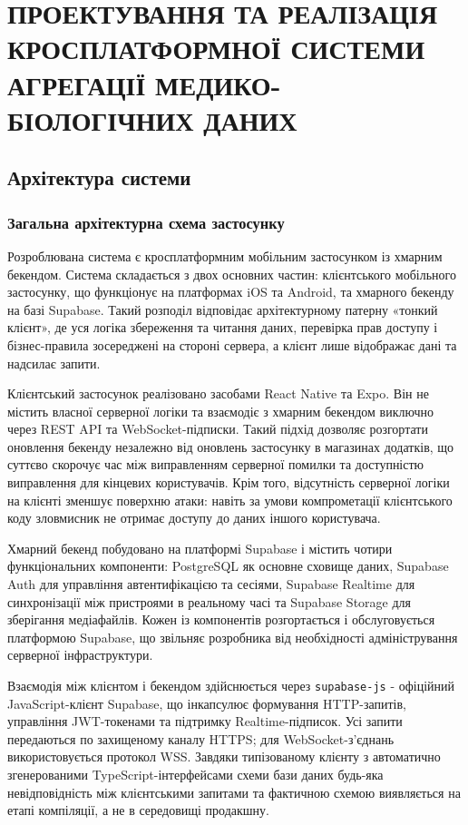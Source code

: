 
\section{ПРОЕКТУВАННЯ ТА РЕАЛІЗАЦІЯ КРОСПЛАТФОРМНОЇ СИСТЕМИ АГРЕГАЦІЇ МЕДИКО-БІОЛОГІЧНИХ ДАНИХ}

\subsection{Архітектура системи}

\subsubsection{Загальна архітектурна схема застосунку}

Розроблювана система є кросплатформним мобільним застосунком із хмарним бекендом. Система складається з двох основних частин: клієнтського мобільного застосунку, що функціонує на платформах iOS та Android, та хмарного бекенду на базі Supabase. Такий розподіл відповідає архітектурному патерну «тонкий клієнт», де уся логіка збереження та читання даних, перевірка прав доступу і бізнес-правила зосереджені на стороні сервера, а клієнт лише відображає дані та надсилає запити.

Клієнтський застосунок реалізовано засобами React Native та Expo. Він не містить власної серверної логіки та взаємодіє з хмарним бекендом виключно через \gls{REST} \gls{API} та WebSocket-підписки. Такий підхід дозволяє розгортати оновлення бекенду незалежно від оновлень застосунку в магазинах додатків, що суттєво скорочує час між виправленням серверної помилки та доступністю виправлення для кінцевих користувачів. Крім того, відсутність серверної логіки на клієнті зменшує поверхню атаки: навіть за умови компрометації клієнтського коду зловмисник не отримає доступу до даних іншого користувача.

Хмарний бекенд побудовано на платформі Supabase і містить чотири функціональних компоненти: PostgreSQL як основне сховище даних, Supabase Auth для управління автентифікацією та сесіями, Supabase Realtime для синхронізації між пристроями в реальному часі та Supabase Storage для зберігання медіафайлів. Кожен із компонентів розгортається і обслуговується платформою Supabase, що звільняє розробника від необхідності адміністрування серверної інфраструктури.

Взаємодія між клієнтом і бекендом здійснюється через \texttt{supabase-js} - офіційний JavaScript-клієнт Supabase, що інкапсулює формування HTTP-запитів, управління \gls{JWT}-токенами та підтримку Realtime-підписок. Усі запити передаються по захищеному каналу \gls{HTTPS}; для WebSocket-з'єднань використовується протокол WSS. Завдяки типізованому клієнту з автоматично згенерованими TypeScript-інтерфейсами схеми бази даних будь-яка невідповідність між клієнтськими запитами та фактичною схемою виявляється на етапі компіляції, а не в середовищі продакшну.

